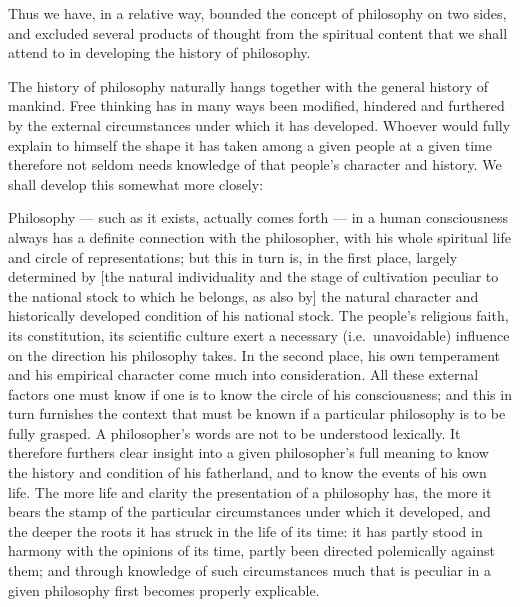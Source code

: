 \documentclass[12pt]{article}
\newcommand{\opage}[1]{\marginnote{\footnotesize\textit{[#1]}}}
\begin{document}
Thus we have, in a relative way, bounded the concept of philosophy on two sides, and excluded several products of thought from the spiritual content that we shall attend to in developing the history of philosophy.

\opage{4r}The history of philosophy naturally hangs together with the general history of mankind. Free thinking has in many ways been modified, hindered and furthered by the external circumstances under which it has developed. Whoever would fully explain to himself the shape it has taken among a given people at a given time therefore not seldom needs knowledge of that people's character and history. We shall develop this somewhat more closely:

Philosophy --- such as it exists, actually comes forth --- in a human consciousness always has a definite connection with the philosopher, with his whole spiritual life and circle of representations; but this in turn is, in the first place, largely determined by [the natural individuality and the stage of cultivation peculiar to the national stock to which he belongs, as also by] the natural character and historically developed condition of his national stock. The people's religious faith, its constitution, its scientific culture exert a necessary (i.e.\ unavoidable) influence on the direction his philosophy takes. In the second place, his own temperament and his empirical character come much into consideration. All these external factors one must know if one is to know the circle of his consciousness; and this in turn furnishes the context that must be known if a particular philosophy is to be fully grasped. A philosopher's words are not to be understood lexically. It therefore furthers clear insight into a given philosopher's full meaning to know the history and condition of his fatherland, and to know the events of his own life. The more life and clarity the presentation of a philosophy has, the more it bears the stamp of the particular circumstances under which it developed, and the deeper the roots it has struck in the life of its time: it has\opage{4v} partly stood in harmony with the opinions of its time, partly been directed polemically against them; and through knowledge of such circumstances much that is peculiar in a given philosophy first becomes properly explicable.
\end{document}

